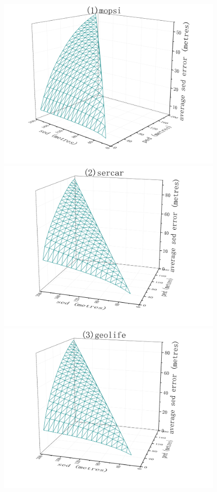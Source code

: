 {\begin{figure}[tb!]
	\centering
	\includegraphics[scale = 0.210]{figures/Fig-BITT-mopsi-sed-error.png}\hspace{1ex}
	\includegraphics[scale = 0.210]{figures/Fig-BITT-sercar-sed-error.png}\hspace{1ex}
	\includegraphics[scale = 0.210]{figures/Fig-BITT-geolife-sed-error.png}\hspace{1ex}

\end{figure}}
